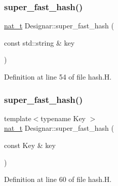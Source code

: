 \subsubsection{\texorpdfstring{super\+\_\+fast\+\_\+hash()}{super\_fast\_hash()}\hspace{0.1cm}{\footnotesize\ttfamily [3/5]}}
{\footnotesize\ttfamily \hyperlink{namespace_designar_aa72662848b9f4815e7bf31a7cf3e33d1}{nat\+\_\+t} Designar\+::super\+\_\+fast\+\_\+hash (\begin{DoxyParamCaption}\item[{const std\+::string \&}]{key }\end{DoxyParamCaption})\hspace{0.3cm}{\ttfamily [inline]}}



Definition at line 54 of file hash.\+H.

\mbox{\label{namespace_designar_a1996522f2f70bdf5dc5659a5a0e42c86}} 
\subsubsection{\texorpdfstring{super\+\_\+fast\+\_\+hash()}{super\_fast\_hash()}\hspace{0.1cm}{\footnotesize\ttfamily [4/5]}}
{\footnotesize\ttfamily template$<$typename Key $>$ \\
\hyperlink{namespace_designar_aa72662848b9f4815e7bf31a7cf3e33d1}{nat\+\_\+t} Designar\+::super\+\_\+fast\+\_\+hash (\begin{DoxyParamCaption}\item[{const Key \&}]{key }\end{DoxyParamCaption})\hspace{0.3cm}{\ttfamily [inline]}}



Definition at line 60 of file hash.\+H.

\mbox{\label{namespace_designar_af31e2906f9449591dfe3b6380768ad44}} 
